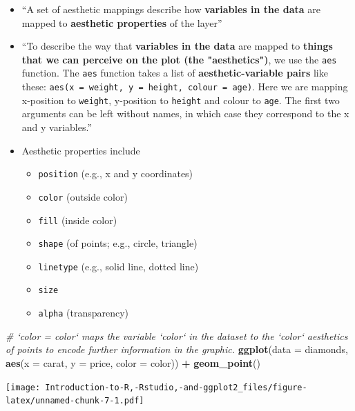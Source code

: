 \documentclass[]{book}
\newenvironment{Shaded}{\begin{snugshade}}{\end{snugshade}}
\newcommand{\CommentTok}[1]{\textcolor[rgb]{0.56,0.35,0.01}{\textit{#1}}}
\newcommand{\DataTypeTok}[1]{\textcolor[rgb]{0.13,0.29,0.53}{#1}}
\newcommand{\KeywordTok}[1]{\textcolor[rgb]{0.13,0.29,0.53}{\textbf{#1}}}
\newcommand{\NormalTok}[1]{#1}
\newcommand{\OperatorTok}[1]{\textcolor[rgb]{0.81,0.36,0.00}{\textbf{#1}}}
\newcommand{\StringTok}[1]{\textcolor[rgb]{0.31,0.60,0.02}{#1}}
\providecommand{\tightlist}{%
  \setlength{\itemsep}{0pt}\setlength{\parskip}{0pt}}
\begin{document}
\begin{itemize}
\item
  ``A set of aesthetic mappings describe how \textbf{variables in the data} are mapped to \textbf{aesthetic properties} of the layer'' \citep{ggplot2}
\item
  ``To describe the way that \textbf{variables in the data} are mapped to \textbf{things that we can perceive on the plot (the "aesthetics")}, we use the \texttt{aes} function. The \texttt{aes} function takes a list of \textbf{aesthetic-variable pairs} like these: \texttt{aes(x\ =\ weight,\ y\ =\ height,\ colour\ =\ age)}. Here we are mapping x-position to \texttt{weight}, y-position to \texttt{height} and colour to \texttt{age}. The first two arguments can be left without names, in which case they correspond to the x and y variables.'' \citep{ggplot2}
\item
  Aesthetic properties include

  \begin{itemize}
  \tightlist
  \item
    \texttt{position} (e.g., x and y coordinates)
  \item
    \texttt{color} (outside color)
  \item
    \texttt{fill} (inside color)
  \item
    \texttt{shape} (of points; e.g., circle, triangle)
  \item
    \texttt{linetype} (e.g., solid line, dotted line)
  \item
    \texttt{size}
  \item
    \texttt{alpha} (transparency)
  \end{itemize}
\end{itemize}

\begin{Shaded}
\begin{Highlighting}[]
\CommentTok{# `color = color` maps the variable `color` in the dataset to the `color` aesthetics of points to encode further information in the graphic. }
\KeywordTok{ggplot}\NormalTok{(}\DataTypeTok{data =}\NormalTok{ diamonds, }\KeywordTok{aes}\NormalTok{(}\DataTypeTok{x =}\NormalTok{ carat, }\DataTypeTok{y =}\NormalTok{ price, }\DataTypeTok{color =}\NormalTok{ color)) }\OperatorTok{+}\StringTok{ }\KeywordTok{geom_point}\NormalTok{()}
\end{Highlighting}
\end{Shaded}

\texttt{[image: Introduction-to-R,-Rstudio,-and-ggplot2\_files/figure-latex/unnamed-chunk-7-1.pdf]}
\end{document}
